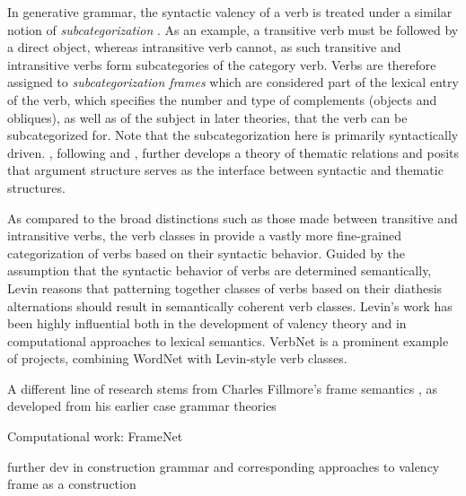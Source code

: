 In generative grammar, the syntactic valency of a verb is treated under a similar notion of \textit{subcategorization} \citep{chomsky1965a}. As an example, a transitive verb must be followed by a direct object, whereas intransitive verb cannot, as such transitive and intransitive verbs form subcategories of the category verb. Verbs are therefore assigned to \textit{subcategorization frames} which are considered part of the lexical entry of the verb, which specifies the number and type of complements (objects and obliques), as well as of the subject in later theories, that the verb can be subcategorized for. Note that the subcategorization here is primarily syntactically driven. \citet{jackendoff1972,jackendoff1987,jackendoff1992}, following \citet{katz1963} and \citet{gruber1962}, further develops a theory of thematic relations and posits that argument structure serves as the interface between syntactic and thematic structures.


As compared to the broad distinctions such as those made between transitive and intransitive verbs, the verb classes in \citet{levin1993} provide a vastly more fine-grained categorization of verbs based on their syntactic behavior. Guided by the assumption that the syntactic behavior of verbs are determined semantically, Levin reasons that patterning together classes of verbs based on their diathesis alternations should result in semantically coherent verb classes. Levin's work has been highly influential both in the development of valency theory and in computational approaches to lexical semantics. VerbNet \cite{kipper-schuler2005, kipper2006, kipper2008} is a prominent example of projects, combining WordNet \cite{fellbaum1998, miller1995} with Levin-style verb classes. 

A different line of research stems from Charles Fillmore's frame semantics \citep{fillmore1977, fillmore1977a, fillmore1982},
as developed from his earlier
case grammar \citep{fillmore1968,fillmore1970} theories

Computational work: FrameNet \citep{fillmore2015}

further dev in construction grammar and corresponding approaches to valency frame as a construction \citet{goldberg1992,goldberg1995}


